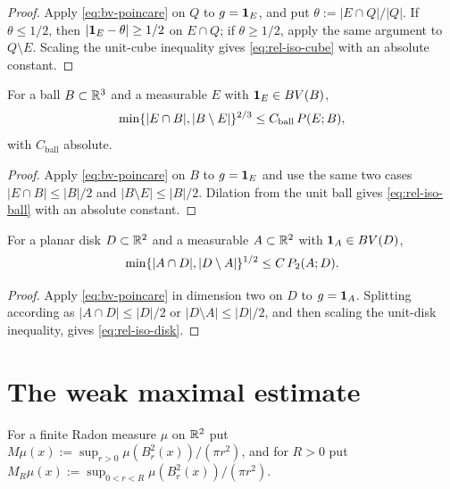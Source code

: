 \begin{proof}
Apply \eqref{eq:bv-poincare} on $Q$ to $g=\mathbf 1_{E}$, and put
$\theta:=|E\cap Q|/|Q|$.  If $\theta\le1/2$, then
$|\mathbf 1_{E}-\theta|\ge1/2$ on $E\cap Q$; if $\theta\ge1/2$, apply the same
argument to $Q\setminus E$.  Scaling the unit-cube inequality gives
\eqref{eq:rel-iso-cube} with an absolute constant.
\end{proof}

\begin{proposition}\label{prop:rel-iso-ball}
For a ball $B\subset\mathbb R^3$ and a measurable $E$ with $\mathbf 1_{E}\in BV(B)$,
\begin{equation}\label{eq:rel-iso-ball}
  \min\{|E\cap B|,|B\setminus E|\}^{2/3}\le C_{\mathrm{ball}}\,P(E;B),
\end{equation}
with $C_{\mathrm{ball}}$ absolute.
\end{proposition}

\begin{proof}
Apply \eqref{eq:bv-poincare} on $B$ to $g=\mathbf 1_{E}$ and use the same two cases
$|E\cap B|\le|B|/2$ and $|B\setminus E|\le|B|/2$.  Dilation from the unit
ball gives \eqref{eq:rel-iso-ball} with an absolute constant.
\end{proof}

\begin{proposition}\label{prop:rel-iso-disk}
For a planar disk $D\subset\mathbb R^2$ and a measurable $A\subset\mathbb R^2$ with
$\mathbf 1_{A}\in BV(D)$,
\begin{equation}\label{eq:rel-iso-disk}
  \min\{|A\cap D|,|D\setminus A|\}^{1/2}\le C\,P_2(A;D).
\end{equation}
\end{proposition}

\begin{proof}
Apply \eqref{eq:bv-poincare} in dimension two on $D$ to $g=\mathbf 1_{A}$.  Splitting
according as $|A\cap D|\le|D|/2$ or $|D\setminus A|\le|D|/2$, and then
scaling the unit-disk inequality, gives \eqref{eq:rel-iso-disk}.
\end{proof}

\section{The weak maximal estimate}\label{sec:maximal}

\begin{definition}\label{def:maximal}
For a finite Radon measure $\mu$ on $\mathbb R^2$ put
$M\mu(x):=\sup_{r>0}\mu(B_r^2(x))/(\pi r^2)$, and for $R>0$ put
$M_R\mu(x):=\sup_{0<r<R}\mu(B_r^2(x))/(\pi r^2)$.
\end{definition}

